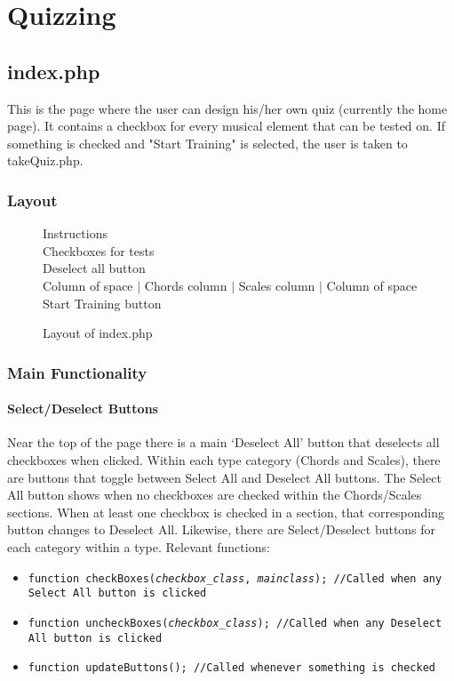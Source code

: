 \documentclass{article}
\begin{document}
\section{Quizzing}

\subsection{index.php}

This is the page where the user can design his/her own quiz (currently the home page). It contains a checkbox for every musical element that can be tested on. If something is checked and "Start Training" is selected, the user is taken to takeQuiz.php.

\subsubsection{Layout}
\begin{figure}[H]
    \centering
    Instructions \\
    Checkboxes for tests \\
    Deselect all button \\
    Column of space $\vert$ Chords column $\vert$ Scales column $\vert$ Column of space \\
    Start Training button
    \caption{Layout of index.php}
    \label{fig:index}
\end{figure}

\subsubsection{Main Functionality}
\paragraph{Select/Deselect Buttons}
Near the top of the page there is a main `Deselect All' button that deselects all checkboxes when clicked. Within each type category (Chords and Scales), there are buttons that toggle between Select All and Deselect All buttons. The Select All button shows when no checkboxes are checked within the Chords/Scales sections. When at least one checkbox is checked in a section, that corresponding button changes to Deselect All. Likewise, there are Select/Deselect buttons for each category within a type.
\vskip 3mm
\noindent Relevant functions:
\begin{itemize}
\item \texttt{function checkBoxes(\textit{checkbox\_class}, \textit{mainclass}); //Called when any Select All button is clicked}
\item \texttt{function uncheckBoxes(\textit{checkbox\_class}); //Called when any Deselect All button is clicked}
\item \texttt{function updateButtons(); //Called whenever something is checked}
\end{itemize}
\end{document}
